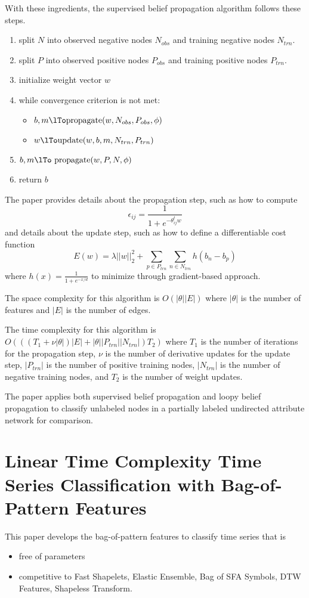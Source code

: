 \documentclass[12pt]{amsart}
\theoremstyle{definition}
\begin{document}
With these ingredients, the supervised belief propagation algorithm follows these steps.
\begin{enumerate}[1.]
\item split $N$ into observed negative nodes $N_{obs}$ and training negative nodes $N_{trn}$.
\item split $P$ into observed positive nodes $P_{obs}$ and training positive nodes $P_{trn}$.
\item initialize weight vector $w$
\item while convergence criterion is not met:
\begin{itemize}
\item $b, m \lTo \text{propagate}(w, N_{obs}, P_{obs}, \phi)$
\item $w \lTo \text{update}(w, b, m, N_{trn}, P_{trn})$
\end{itemize}
\item $b, m \lTo \text{ propagate}(w, P, N, \phi)$
\item return $b$
\end{enumerate}

The paper provides details about the propagation step, such as how to compute
$$\epsilon_{ij} = \frac{1}{1 + e^{- \theta_{ij}^t w}}$$
and details about the update step, such as how to define a differentiable cost function
$$E(w) = \lambda ||w||_2^2 + \sum \limits_{p \in P_{trn}} \sum \limits_{n \in N_{trn}} h(b_n - b_p)$$
where $h(x) = \frac{1}{1 + e^{-x/d}}$ to minimize through gradient-based approach.

The space complexity for this algorithm is $O(|\theta| |E|)$ where $|\theta|$ is the number of features and $|E|$ is the number of edges.

The time complexity for this algorithm is $O(((T_1 + \nu |\theta|) |E| + |\theta| |P_{trn}| |N_{trn}|) T_2)$ where $T_1$ is the number of iterations for the propagation step, $\nu$ is the number of derivative updates for the update step, $|P_{trn}|$ is the number of positive training nodes, $|N_{trn}|$ is the number of negative training nodes, and $T_2$ is the number of weight updates. 

The paper applies both supervised belief propagation and loopy belief propagation to classify unlabeled nodes in a partially labeled undirected attribute network for comparison.
\vfill
\pagebreak

\section{Linear Time Complexity Time Series Classification with Bag-of-Pattern Features} This paper \cite{BoPF} develops the bag-of-pattern features to classify time  series that is
\begin{itemize}
\item free of parameters
\item competitive to Fast Shapelets, Elastic Ensemble, Bag of SFA Symbols, DTW Features, Shapeless Transform.
\end{itemize}
\end{document}
